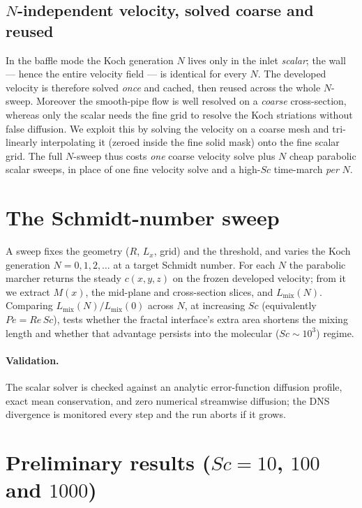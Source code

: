 \documentclass[11pt]{article}
\newcommand{\Sc}{\mathit{Sc}}
\newcommand{\Pe}{\mathit{Pe}}
\newcommand{\Renum}{\mathit{Re}}
\begin{document}
\subsection{$N$-independent velocity, solved coarse and reused}

In the baffle mode the Koch generation $N$ lives only in the inlet
\emph{scalar}; the wall --- hence the entire velocity field --- is
identical for every $N$. The developed velocity is therefore solved
\emph{once} and cached, then reused across the whole $N$-sweep. Moreover
the smooth-pipe flow is well resolved on a \emph{coarse} cross-section,
whereas only the scalar needs the fine grid to resolve the Koch
striations without false diffusion. We exploit this by solving the
velocity on a coarse mesh and tri-linearly interpolating it (zeroed
inside the fine solid mask) onto the fine scalar grid. The full $N$-sweep
thus costs \emph{one} coarse velocity solve plus $N$ cheap parabolic
scalar sweeps, in place of one fine velocity solve and a high-$\Sc$
time-march \emph{per} $N$.

\section{The Schmidt-number sweep}

A sweep fixes the geometry ($R$, $L_x$, grid) and the threshold, and
varies the Koch generation $N = 0,1,2,\dots$ at a target Schmidt number.
For each $N$ the parabolic marcher returns the steady $c(x,y,z)$ on the
frozen developed velocity; from it we extract $M(x)$, the mid-plane and
cross-section slices, and $L_{\mathrm{mix}}(N)$. Comparing
$L_{\mathrm{mix}}(N)/L_{\mathrm{mix}}(0)$ across $N$, at increasing $\Sc$
(equivalently $\Pe = \Renum\,\Sc$), tests whether the fractal interface's
extra area shortens the mixing length and whether that advantage persists
into the molecular ($\Sc \sim 10^3$) regime.

\paragraph{Validation.} The scalar solver is checked against an analytic
error-function diffusion profile, exact mean conservation, and zero
numerical streamwise diffusion; the DNS divergence is monitored every
step and the run aborts if it grows.

\section{Preliminary results ($\Sc = 10$, $100$ and $1000$)}
\label{sec:results}
\end{document}
